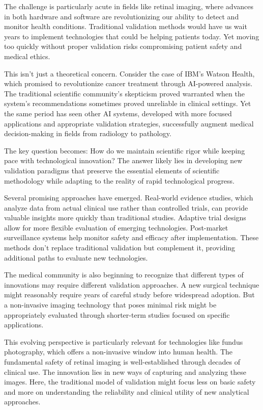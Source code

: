 \documentclass[
  Letterpaper,
]{scrbook}
\begin{document}
The challenge is particularly acute in fields like retinal imaging,
where advances in both hardware and software are revolutionizing our
ability to detect and monitor health conditions. Traditional validation
methods would have us wait years to implement technologies that could be
helping patients today. Yet moving too quickly without proper validation
risks compromising patient safety and medical ethics.

This isn't just a theoretical concern. Consider the case of IBM's Watson
Health, which promised to revolutionize cancer treatment through
AI-powered analysis. The traditional scientific community's skepticism
proved warranted when the system's recommendations sometimes proved
unreliable in clinical settings. Yet the same period has seen other AI
systems, developed with more focused applications and appropriate
validation strategies, successfully augment medical decision-making in
fields from radiology to pathology.

The key question becomes: How do we maintain scientific rigor while
keeping pace with technological innovation? The answer likely lies in
developing new validation paradigms that preserve the essential elements
of scientific methodology while adapting to the reality of rapid
technological progress.

Several promising approaches have emerged. Real-world evidence studies,
which analyze data from actual clinical use rather than controlled
trials, can provide valuable insights more quickly than traditional
studies. Adaptive trial designs allow for more flexible evaluation of
emerging technologies. Post-market surveillance systems help monitor
safety and efficacy after implementation. These methods don't replace
traditional validation but complement it, providing additional paths to
evaluate new technologies.

The medical community is also beginning to recognize that different
types of innovations may require different validation approaches. A new
surgical technique might reasonably require years of careful study
before widespread adoption. But a non-invasive imaging technology that
poses minimal risk might be appropriately evaluated through shorter-term
studies focused on specific applications.

This evolving perspective is particularly relevant for technologies like
fundus photography, which offers a non-invasive window into human
health. The fundamental safety of retinal imaging is well-established
through decades of clinical use. The innovation lies in new ways of
capturing and analyzing these images. Here, the traditional model of
validation might focus less on basic safety and more on understanding
the reliability and clinical utility of new analytical approaches.
\end{document}
